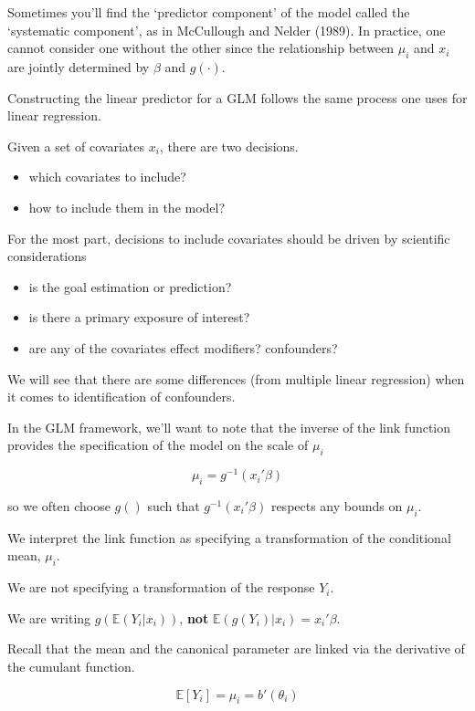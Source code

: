 \documentclass[
  letterpaper,
  DIV=11,
  numbers=noendperiod]{scrreport}
\providecommand{\tightlist}{%
  \setlength{\itemsep}{0pt}\setlength{\parskip}{0pt}}\usepackage{longtable,booktabs,array}
\begin{document}
Sometimes you'll find the `predictor component' of the model called the
`systematic component', as in McCullough and Nelder (1989). In practice,
one cannot consider one without the other since the relationship between
\(\mu_i\) and \(x_i\) are jointly determined by \(\beta\) and
\(g(\cdot)\).

Constructing the linear predictor for a GLM follows the same process one
uses for linear regression.

Given a set of covariates \(x_i\), there are two decisions.

\begin{itemize}
\tightlist
\item
  which covariates to include?
\item
  how to include them in the model?
\end{itemize}

For the most part, decisions to include covariates should be driven by
scientific considerations

\begin{itemize}
\tightlist
\item
  is the goal estimation or prediction?
\item
  is there a primary exposure of interest?
\item
  are any of the covariates effect modifiers? confounders?
\end{itemize}

We will see that there are some differences (from multiple linear
regression) when it comes to identification of confounders.

In the GLM framework, we'll want to note that the inverse of the link
function provides the specification of the model on the scale of
\(\mu_i\)

\[\mu_i = g^{-1}(x_i' \beta)\]

so we often choose \(g()\) such that \(g^{-1}(x_i' \beta)\) respects any
bounds on \(\mu_i\).

We interpret the link function as specifying a transformation of the
conditional mean, \(\mu_i\).

We are not specifying a transformation of the response \(Y_i\).

We are writing \(g(\mathbb E(Y_i|x_i))\), \textbf{not}
\(\mathbb E(g(Y_i) | x_i) = x_i'\beta\).

Recall that the mean and the canonical parameter are linked via the
derivative of the cumulant function.

\[\mathbb E[Y_i] = \mu_i = b'(\theta_i)\]
\end{document}
